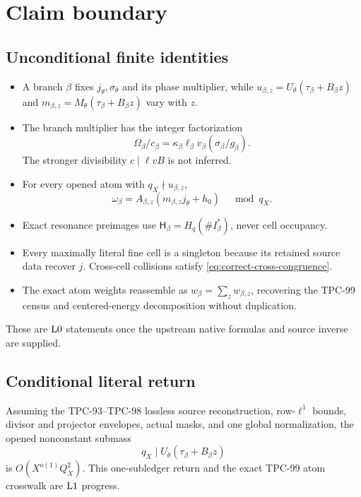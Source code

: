\section{Claim boundary}
\label{sec:claim-boundary}

\subsection*{Unconditional finite identities}

\begin{itemize}[leftmargin=2em]
\item A branch \(\beta\) fixes \(j_\theta,\sigma_\theta\) and its
  phase multiplier, while
  \(u_{\beta,z}=U_\theta(\tau_\beta+B_\beta z)\) and
  \(m_{\beta,z}=M_\theta(\tau_\beta+B_\beta z)\) vary with \(z\).
\item The branch multiplier has the integer factorization
  \[
  \Omega_\beta/c_\beta
  =
  \kappa_\beta\ell_\beta v_\beta
  (\sigma_\beta/g_\beta).
  \]
  The stronger divisibility \(c\mid\ell vB\) is not inferred.
\item For every opened atom with \(q_X\nmid u_{\beta,z}\),
  \[
  \omega_\beta
  =
  A_{\beta,z}(m_{\beta,z}j_\theta+h_0)
  \quad\bmod q_X.
  \]
\item Exact resonance preimages use
  \(\mathsf H_\beta=H_q(\#I_\beta^\ast)\), never cell occupancy.
\item Every maximally literal fine cell is a singleton because its
  retained source data recover \(j\).  Cross-cell collisions satisfy
  \eqref{eq:correct-cross-congruence}.
\item The exact atom weights reassemble as
  \(w_\beta=\sum_z w_{\beta,z}\), recovering the TPC-99 census and
  centered-energy decomposition without duplication.
\end{itemize}

These are \(\mathrm{L0}\) statements once the upstream native formulas
and source inverse are supplied.

\subsection*{Conditional literal return}

Assuming the TPC-93--TPC-98 lossless source reconstruction,
row-\(\ell^1\) bounds, divisor and projector envelopes, actual masks,
and one global normalization, the opened nonconstant submass
\[
 q_X\mid U_\theta(\tau_\beta+B_\beta z)
\]
is \(O(X^{o(1)}Q_X^2)\).  This one-subledger return and the exact
TPC-99 atom crosswalk are \(\mathrm{L1}\) progress.

